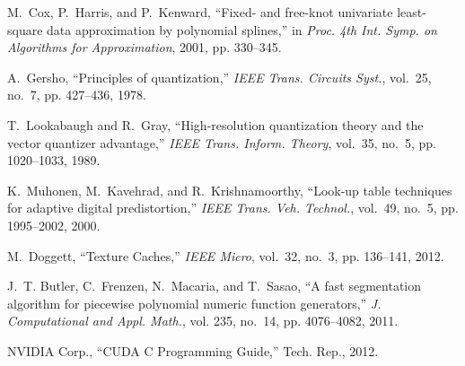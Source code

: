 \documentclass[a4paper,english]{IEEEtran}
\begin{document}
\begin{thebibliography}{10}
M.~Cox, P.~Harris, and P.~Kenward, ``{Fixed- and free-knot univariate
  least-square data approximation by polynomial splines},'' in \emph{{Proc. 4th
  Int. Symp. on Algorithms for Approximation}}, 2001, pp. 330--345.

A.~Gersho, ``{Principles of quantization},'' \emph{IEEE Trans. Circuits Syst.},
  vol.~25, no.~7, pp. 427--436, 1978.

T.~Lookabaugh and R.~Gray, ``{High-resolution quantization theory and the
  vector quantizer advantage},'' \emph{IEEE Trans. Inform. Theory}, vol.~35,
  no.~5, pp. 1020--1033, 1989.

K.~Muhonen, M.~Kavehrad, and R.~Krishnamoorthy, ``{Look-up table techniques for
  adaptive digital predistortion},'' \emph{{IEEE} Trans. Veh. Technol.},
  vol.~49, no.~5, pp. 1995--2002, 2000.

M.~Doggett, ``{Texture Caches},'' \emph{IEEE Micro}, vol.~32, no.~3, pp.
  136--141, 2012.

J.~T. Butler, C.~Frenzen, N.~Macaria, and T.~Sasao, ``{A fast segmentation
  algorithm for piecewise polynomial numeric function generators},'' \emph{J.
  Computational and Appl. Math.}, vol. 235, no.~14, pp. 4076--4082, 2011.

{NVIDIA Corp.}, ``{CUDA C Programming Guide},'' Tech. Rep., 2012.

\end{thebibliography}
\end{document}

